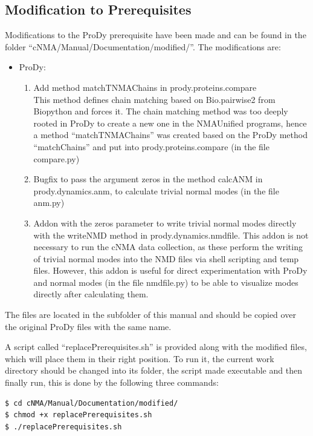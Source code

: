 \documentclass[11pt]{article}
\begin{document}
\subsection{Modification to Prerequisites}
Modifications to the ProDy prerequisite have been made and can be found in the folder ``cNMA/Manual/Documentation/modified/''. The modifications are:

\begin{itemize}
 \item ProDy:
   \begin{enumerate}
	\item Add method matchTNMAChains in prody.proteins.compare\\This method defines chain matching based on Bio.pairwise2 from Biopython and forces it. 
	The chain matching method was too deeply rooted in ProDy to create a new one in the NMAUnified programs, hence a method ``matchTNMAChains'' was created based on 
	the ProDy method ``matchChains'' and put into prody.proteins.compare (in the file compare.py)
	\item Bugfix to pass the argument zeros in the method calcANM in prody.dynamics.anm, to calculate trivial normal modes (in the file anm.py)
	\item Addon with the zeros parameter to write trivial normal modes directly with the writeNMD method in prody.dynamics.nmdfile. This addon is not necessary to run the cNMA data collection, as these perform the writing of trivial normal modes into the NMD files via shell scripting and temp files. However, this addon is useful for direct experimentation with ProDy and normal modes (in the file nmdfile.py) to be able to visualize modes directly after calculating them.
   \end{enumerate}
\end{itemize}
\noindent
The files are located in the  subfolder of this manual and should be copied over the original ProDy files with the same name.

A script called ``replacePrerequisites.sh'' is provided along with the modified files, which will place them in their right position. To run it, the current work directory should be changed into its folder, the script made executable and then finally run, this is done by the following three commands:

\begin{lstlisting}
$ cd cNMA/Manual/Documentation/modified/
$ chmod +x replacePrerequisites.sh
$ ./replacePrerequisites.sh
\end{lstlisting}
\end{document}

